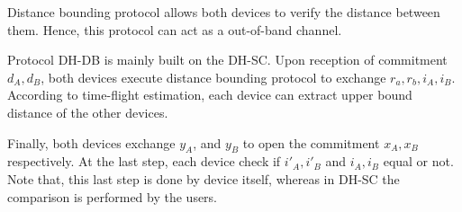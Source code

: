 Distance bounding protocol allows both devices to verify the distance between them. Hence, this protocol can act as a out-of-band channel. 

Protocol DH-DB is mainly built on the DH-SC. Upon reception of commitment $d_A,d_B$, both devices execute distance bounding protocol to exchange $r_a,r_b, i_A, i_B$. According to time-flight estimation, each device can extract upper bound distance of the other devices. 

Finally, both devices exchange $y_A$, and $y_B$ to open the commitment $x_A, x_B$ respectively. At the last step, each device check if $i'_A,i'_B$ and $i_A,i_B$ equal or not.  Note that, this last step is done by device itself, whereas in DH-SC the comparison is performed by the users. 

\begin{center}
\end{center}
